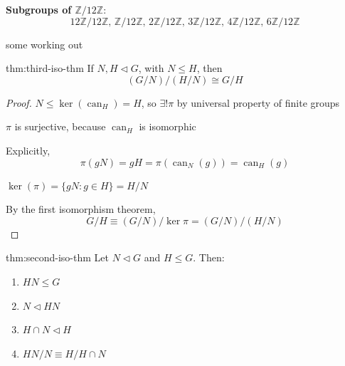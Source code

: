 \documentclass{article}
\DeclareMathOperator{\can}{can}
\begin{document}
\textbf{Subgroups of $\mathbb{Z} / 12\mathbb{Z}$}:
\[12\mathbb{Z} /12\mathbb{Z},\, \mathbb{Z} / 12\mathbb{Z},\,2\mathbb{Z} /12\mathbb{Z},\,3\mathbb{Z} /12\mathbb{Z},\,4\mathbb{Z} /12\mathbb{Z},\,6\mathbb{Z} /12\mathbb{Z}\]

some working out

\begin{thm}{thm:third-iso-thm}{}
    If $N, H \triangleleft G$, with $N \le H$, then
    \[(G /N) / (H /N) \cong G /H\]
\end{thm}

\begin{proof}
    $N \le \ker(\can_{H}) = H$, so $\exists !\pi$ by universal property of finite groups

    $\pi$ is surjective, because $\can_{H}$ is isomorphic

    Explicitly,
    \[\pi(gN) = gH = \pi(\can_{N}(g)) = \can_{H}(g)\]

    $\ker(\pi) = \{gN : g\in H\} = H /N$

    By the first isomorphism theorem,
    \[G /H \equiv (G /N) / \ker\pi = (G /N) / (H /N)\]
\end{proof}

\newpage
\begin{thm}{thm:second-iso-thm}{}
    Let $N \triangleleft G$ and $H \le G$. Then:
    \begin{enumerate}
        \item $HN \le G$
        \item $N \triangleleft HN$
        \item $H \cap N \triangleleft H$
        \item $HN /N \equiv H / H\cap N$
    \end{enumerate}
\end{thm}
\end{document}
